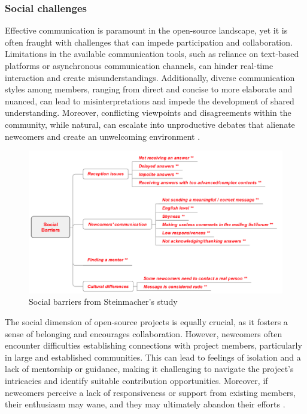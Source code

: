 \subsubsection{Social challenges}

Effective communication is paramount in the open-source landscape, yet it is often fraught with challenges that can impede participation and collaboration. Limitations in the available communication tools, such as reliance on text-based platforms or asynchronous communication channels, can hinder real-time interaction and create misunderstandings. Additionally, diverse communication styles among members, ranging from direct and concise to more elaborate and nuanced, can lead to misinterpretations and impede the development of shared understanding. Moreover, conflicting viewpoints and disagreements within the community, while natural, can escalate into unproductive debates that alienate newcomers and create an unwelcoming environment \cite{02steinmacher2015social}.

\begin{figure}[ht]
    \centering
    \includegraphics[width=1\linewidth]{figs/socialbarrier.png}
    \caption{Social barriers from Steinmacher's study \cite{03steinmacher2019overcoming}}
    \label{fig:socialbarrier}
\end{figure}

The social dimension of open-source projects is equally crucial, as it fosters a sense of belonging and encourages collaboration. However, newcomers often encounter difficulties establishing connections with project members, particularly in large and established communities. This can lead to feelings of isolation and a lack of mentorship or guidance, making it challenging to navigate the project's intricacies and identify suitable contribution opportunities. Moreover, if newcomers perceive a lack of responsiveness or support from existing members, their enthusiasm may wane, and they may ultimately abandon their efforts \cite{01steinmacher2015systematic,02steinmacher2015social,03steinmacher2019overcoming,04guizani2021long,14hannebauer2017relationship}.

